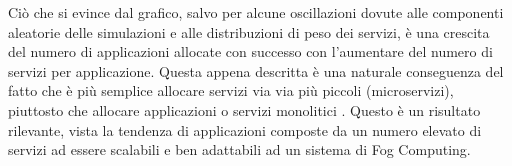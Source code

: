 Ciò che si evince dal grafico, salvo per alcune oscillazioni dovute alle componenti aleatorie delle simulazioni e alle distribuzioni di peso dei servizi, è una crescita del numero di applicazioni allocate con successo con l'aumentare del numero di servizi per applicazione. Questa appena descritta è una naturale conseguenza del fatto che è più semplice allocare servizi via via più piccoli (microservizi), piuttosto che allocare applicazioni o servizi monolitici \cite{microservices_app_placement}. Questo è un risultato rilevante, vista la tendenza di applicazioni composte da un numero elevato di servizi ad essere scalabili e ben adattabili ad un sistema di Fog Computing.




